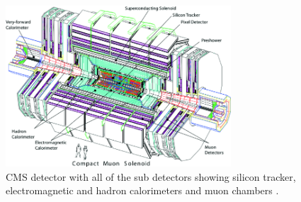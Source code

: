 \begin{itemize}

\end{itemize}

\begin{figure}[!htp]
\centering
\includegraphics[width=0.75\textwidth]{ashish_thesis/cms_exp.png}
\caption[CMS Experiment Design]{%
   CMS detector with all of the sub detectors showing silicon tracker, electromagnetic and hadron calorimeters and muon chambers \cite{CMS:2008xjf}. 
}
\label{fig:cms}
\end{figure}


